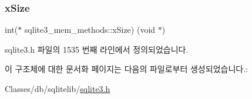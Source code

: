 \subsubsection{\texorpdfstring{x\+Size}{xSize}}
{\footnotesize\ttfamily int($\ast$ sqlite3\+\_\+mem\+\_\+methods\+::x\+Size) (void $\ast$)}



sqlite3.\+h 파일의 1535 번째 라인에서 정의되었습니다.



이 구조체에 대한 문서화 페이지는 다음의 파일로부터 생성되었습니다.\+:\begin{DoxyCompactItemize}
\item 
Classes/db/sqlitelib/\hyperlink{sqlite3_8h}{sqlite3.\+h}\end{DoxyCompactItemize}
